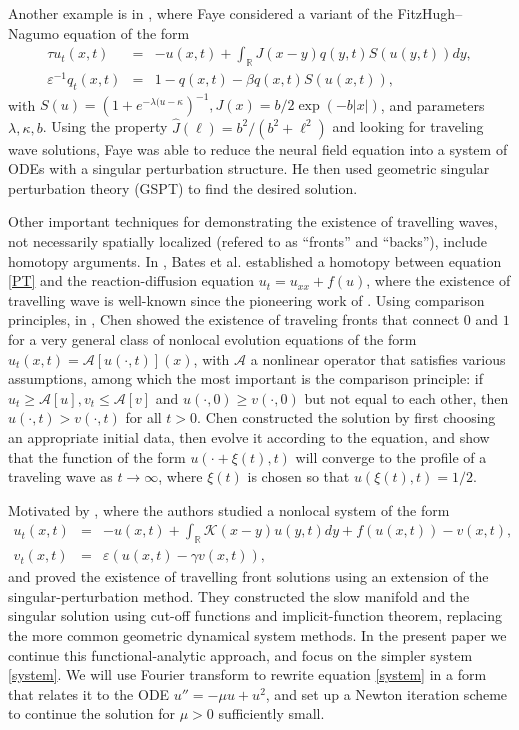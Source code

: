 \documentclass[letterpaper,11pt]{article}
\newcommand{\R}{\mathbb{R}}
\newcommand{\eps}{\varepsilon}
\newcommand{\K}{\mathcal{K}}
\numberwithin{equation}{section}
\theoremstyle{plain}
\theoremstyle{remark}
\begin{document}
Another example is in \cite{faye2013existence}, where Faye considered a variant of the FitzHugh–Nagumo equation of the form
\begin{subequations}
\begin{eqnarray}
\tau u_t(x,t) &=& -u(x,t)+\int_\R J(x-y)q(y,t)S(u(y,t))dy, \\
\eps^{-1} q_t(x,t) &=& 1-q(x,t)-\beta q(x,t) S(u(x,t)) ,
\end{eqnarray}
\end{subequations}
with $S(u) = (1+e^{-\lambda(u-\kappa})^{-1}, J(x) = b/2\exp(-b|x|)$, and parameters $\lambda,\kappa,b$. Using the property $\widehat{J}(\ell) = b^2/(b^2+\ell^2)$ and looking for traveling wave solutions, Faye was able to reduce the neural field equation into a system of ODEs with a singular perturbation structure. He then used geometric singular perturbation theory (GSPT) to find the desired solution.

Other important techniques for demonstrating the existence of travelling waves, not necessarily spatially localized (refered to as ``fronts'' and ``backs''), include homotopy arguments. In \cite{Bates1997}, Bates et al. established a homotopy between equation \eqref{PT} and the reaction-diffusion equation $u_t=u_{xx}+f(u)$, where the existence of travelling wave is well-known since the pioneering work of \cite{KPP}. Using comparison principles, in \cite{chen1997existence}, Chen showed the existence of traveling fronts that connect $0$ and $1$ for a very general class of nonlocal evolution equations of the form $u_t(x,t) = \mathcal{A}[u(\cdot,t)](x)$, with $\mathcal{A}$ a nonlinear operator that satisfies various assumptions, among which the most important is the comparison principle: if $u_t \ge \mathcal{A}[u],v_t \le \mathcal{A}[v]$ and $u(\cdot,0) \ge v(\cdot,0)$ but not equal to each other, then $u(\cdot,t)>v(\cdot,t)$ for all $t>0$. Chen constructed the solution by first choosing an appropriate initial data, then evolve it according to the equation, and show that the function of the form $u(\cdot+\xi(t),t)$ will converge to the profile of a traveling wave as $t\to \infty$, where $\xi(t)$ is chosen so that $u(\xi(t),t)=1/2$.


Motivated by \cite{pulseNLFHN}, where the authors studied a nonlocal system of the form 
\begin{subequations}
\begin{eqnarray}
u_t(x,t) &=& -u(x,t) + \int_{\R} \K(x-y)u(y,t)dy+f(u(x,t))-v(x,t),\\
v_t(x,t) &=& \eps(u(x,t)-\gamma v(x,t)),
\end{eqnarray}
\end{subequations}
and proved the existence of travelling front solutions using an extension of the singular-perturbation method. They constructed the slow manifold and the singular solution using cut-off functions and implicit-function theorem, replacing the more common geometric dynamical system methods. In the present paper we continue this functional-analytic approach, and focus on the simpler system \eqref{system}. We will use Fourier transform to rewrite equation \eqref{system} in a form that relates it to the ODE $u''=-\mu u+u^2$, and set up a Newton iteration scheme to continue the solution for $\mu>0$ sufficiently small.
\end{document}
